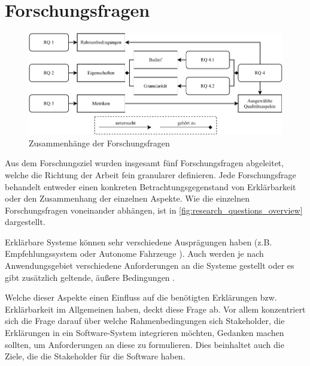 \section{Forschungsfragen}

\begin{figure}[htb!]
    \includegraphics[width=\textwidth]{contents/03_research_design/res/research_questions_overview.pdf}
    \caption{Zusammenhänge der Forschungsfragen}
    \label{fig:research_questions_overview}
\end{figure}

Aus dem Forschungsziel wurden insgesamt fünf Forschungsfragen abgeleitet, welche die Richtung der Arbeit fein granularer definieren. Jede Forschungsfrage behandelt entweder einen konkreten Betrachtungsgegenstand von Erklärbarkeit oder den Zusammenhang der einzelnen Aspekte. Wie die einzelnen Forschungsfragen voneinander abhängen, ist in \autoref{fig:research_questions_overview} dargestellt.

\smallskip

\noindent{}

\smallskip

Erklärbare Systeme können sehr verschiedene Ausprägungen haben (z.B. Empfehlungssystem \cite{kunkel_let_2019} oder Autonome Fahrzeuge \cite{wiegand2019drive}). Auch werden je nach Anwendungsgebiet verschiedene Anforderungen an die Systeme gestellt oder es gibt zusätzlich geltende, äußere Bedingungen \cite{chazette_knowledge_nodate}.

Welche dieser Aspekte einen Einfluss auf die benötigten Erklärungen bzw. Erklärbarkeit im Allgemeinen haben, deckt diese Frage ab. Vor allem konzentriert sich die Frage darauf über welche Rahmenbedingungen sich Stakeholder, die Erklärungen in ein Software-System integrieren möchten, Gedanken machen sollten, um Anforderungen an diese zu formulieren. Dies beinhaltet auch die Ziele, die die Stakeholder für die Software haben.

